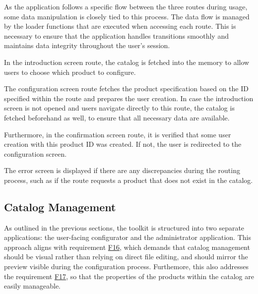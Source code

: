 As the application follows a specific flow between the three routes during usage, some data manipulation is closely tied to this process. The data flow is managed by the loader functions that are executed when accessing each route. This is necessary to ensure that the application handles transitions smoothly and maintains data integrity throughout the user's session.

In the introduction screen route, the catalog is fetched into the memory to allow users to choose which product to configure.

The configuration screen route fetches the product specification based on the ID specified within the route and prepares the user creation. In case the introduction screen is not opened and users navigate directly to this route, the catalog is fetched beforehand as well, to ensure that all necessary data are available.

Furthermore, in the confirmation screen route, it is verified that some user creation with this product ID was created. If not, the user is redirected to the configuration screen. 

The error screen is displayed if there are any discrepancies during the routing process, such as if the route requests a product that does not exist in the catalog.


\subsection{Catalog Management} \label{section:catalog-management}

As outlined in the previous sections, the toolkit is structured into two separate applications: the user-facing configurator and the administrator application. This approach aligns with requirement \hyperref[itm:F16]{F16}, which demands that catalog management should be visual rather than relying on direct file editing, and should mirror the preview visible during the configuration process. Furthemore, this also addresses the requirement \hyperref[itm:F17]{F17}, so that the properties of the products within the catalog are easily manageable.

